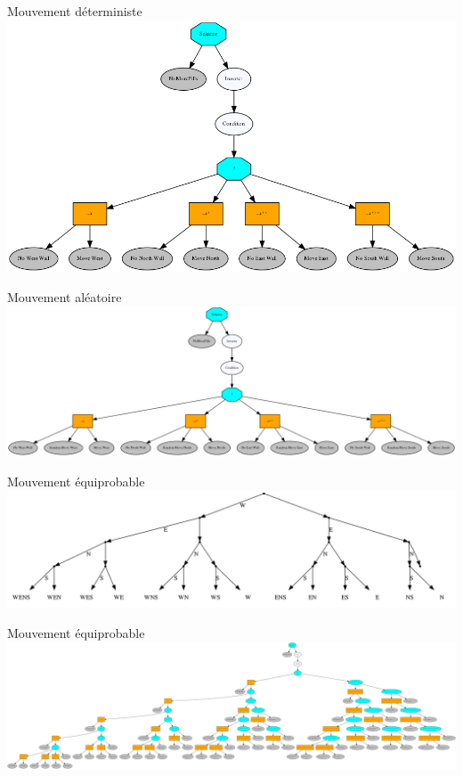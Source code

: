 \documentclass[presentation]{beamer}
\begin{document}
\begin{frame}[label=sec-3-0-2]{Mouvement déterministe}
\includegraphics[width=.9\linewidth]{../Archivage/PacMan_v0/PacManDeterministeBT.png}
\end{frame}

\begin{frame}[label=sec-3-0-3]{Mouvement aléatoire}
\includegraphics[width=.9\linewidth]{../Archivage/PacMan_v0/PacManRandomBT.png}
\end{frame}

\begin{frame}[label=sec-3-0-4]{Mouvement équiprobable}
\includegraphics[width=.9\linewidth]{../Archivage/PacMan_v0/SimplifiedEquiprobable.png}
\end{frame}

\begin{frame}[label=sec-3-0-5]{Mouvement équiprobable}
\includegraphics[width=.9\linewidth]{../Archivage/PacMan_v0/PacManEquiprobableBT.png}
\end{frame}
\end{document}
